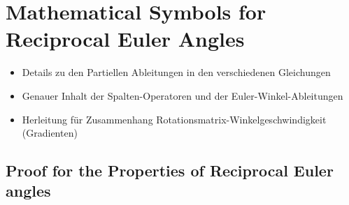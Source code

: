 \documentclass[robotics,article,submit,moreauthors,pdftex]{Definitions/mdpi}
\begin{document}




\appendix
\section{Mathematical Symbols for Reciprocal Euler Angles}
\label{sec:appendix_proof_REW}



\begin{itemize}
    \item Details zu den Partiellen Ableitungen in den verschiedenen Gleichungen
    \item Genauer Inhalt der Spalten-Operatoren und der Euler-Winkel-Ableitungen
    \item Herleitung für Zusammenhang Rotationsmatrix-Winkelgeschwindigkeit (Gradienten)
\end{itemize}


\subsection{Proof for the Properties of Reciprocal Euler angles}
\label{sec:appendix_eulerreciproc}
\end{document}
